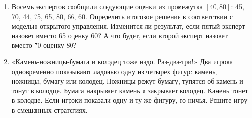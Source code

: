 \documentclass[a4paper,12pt]{extarticle}
\begin{document}
\begin{enumerate}
  \item Восемь экспертов сообщили следующие оценки из промежутка \([40,80]\): 45, 70, 44, 75, 65, 80, 66, 60. 
  Определить итоговое решение в соответствии с моделью открытого управления. 
  Изменится ли результат, если пятый эксперт назовет вместо 65 оценку 60? 
  А что будет, если второй эксперт назовет вместо 70 оценку 80?

  \item
  «Камень-ножницы-бумага и колодец тоже надо. Раз-два-три!» 
  Два игрока одновременно показывают ладонью одну из четырех фигур: камень, ножницы, бумагу или колодец. 
  Ножницы режут бумагу, тупятся об камень и тонут в колодце. 
  Бумага накрывает камень и закрывает колодец. 
  Камень тонет в колодце. 
  Если игроки показали одну и ту же фигуру, то ничья. 
  Решите игру в смешанных стратегиях.


   
\end{enumerate}
\end{document}
